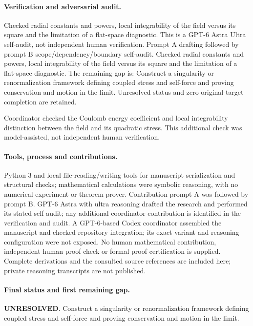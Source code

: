 \documentclass[11pt]{article}
\begin{document}
\paragraph{Verification and adversarial audit.}
Checked radial constants and powers, local integrability of the field versus its square and the limitation of a flat-space diagnostic. This is a GPT-6 Astra Ultra self-audit, not independent human verification. Prompt A drafting followed by prompt B scope/dependency/boundary self-audit. Checked radial constants and powers, local integrability of the field versus its square and the limitation of a flat-space diagnostic. The remaining gap is: Construct a singularity or renormalization framework defining coupled stress and self-force and proving conservation and motion in the limit. Unresolved status and zero original-target completion are retained.

Coordinator checked the Coulomb energy coefficient and local integrability distinction between the field and its quadratic stress. This additional check was model-assisted, not independent human verification.

\paragraph{Tools, process and contributions.}
Python 3 and local file-reading/writing tools for manuscript serialization and structural checks; mathematical calculations were symbolic reasoning, with no numerical experiment or theorem prover. Contribution prompt A was followed by prompt B. GPT-6 Astra with ultra reasoning drafted the research and performed its stated self-audit; any additional coordinator contribution is identified in the verification and audit. A GPT-6-based Codex coordinator assembled the manuscript and checked repository integration; its exact variant and reasoning configuration were not exposed. No human mathematical contribution, independent human proof check or formal proof certification is supplied. Complete derivations and the consulted source references are included here; private reasoning transcripts are not published.

\paragraph{Final status and first remaining gap.}
\textbf{UNRESOLVED}. Construct a singularity or renormalization framework defining coupled stress and self-force and proving conservation and motion in the limit.
\end{document}
